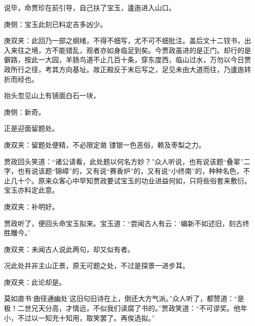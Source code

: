 \begin{parag}
    说毕，命贾珍在前引导，自己扶了宝玉，逶迤进入山口。\begin{note}庚侧：宝玉此刻已料定吉多凶少。\end{note}\begin{note}庚双夹：此回乃一部之纲绪，不得不细写，尤不可不细批注。盖后文十二钗书，出入来往之境，方不能错乱，观者亦如身临足到矣。今贾政虽进的是正门。却行的是僻路，按此一大园，羊肠鸟道不止几百十条，穿东度西，临山过水，万勿以今日贾政所行之径，考其方向基址。故正殿反于末后写之，足见未由大道而往，乃逶迤转折而经也。\end{note}抬头忽见山上有镜面白石一块，\begin{note}庚侧：新奇。\end{note}正是迎面留题处。\begin{note}庚双夹：留题处便精，不必限定凿 镂银一色恶俗，赖及枣梨之力。\end{note}贾政回头笑道：“诸公请看，此处题以何名方妙？”众人听说，也有说该题“叠翠”二字，也有说该题“锦嶂”的，又有说“赛香炉”的，又有说“小终南”的，种种名色，不止几十个。原来众客心中早知贾政要试宝玉的功业进益何如，只将些俗套来敷衍。宝玉亦料定此意。\begin{note}庚双夹：补明好。\end{note}贾政听了，便回头命宝玉拟来。宝玉道：“尝闻古人有云：‘编新不如述旧，刻古终胜雕今。’\begin{note}庚双夹：未闻古人说此两句，却又似有者。\end{note}况此处并非主山正景，原无可题之处，不过是探景一进步耳。\begin{note}庚双夹：此论却是。\end{note}莫如直书‘曲径通幽处’这旧句旧诗在上，倒还大方气派。”众人听了，都赞道：“是极！二世兄天分高，才情远，不似我们读腐了书的。”贾政笑道：“不可谬奖。他年小，不过以一知充十知用，取笑罢了。再俟选拟。”
\end{parag}


